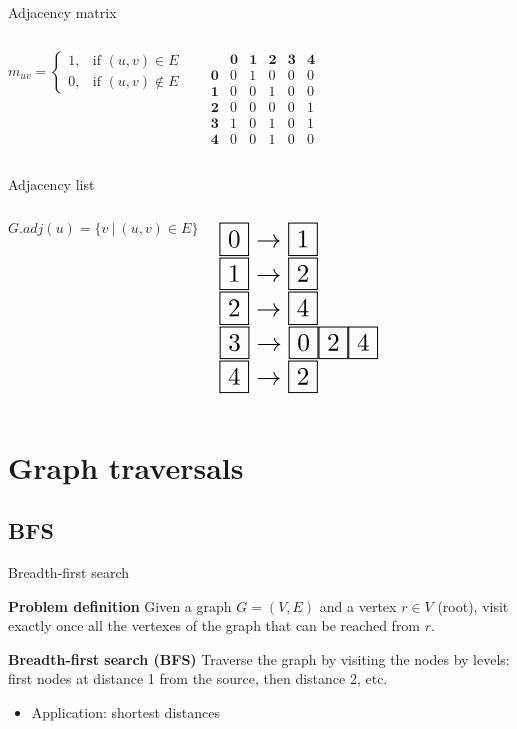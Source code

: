 \documentclass[compress]{beamer}
\newcommand\scalemath[2]{\scalebox{#1}{\mbox{\ensuremath{\displaystyle #2}}}}
\begin{document}
\begin{frame}{Adjacency matrix}
  \begin{columns}
    \[
    m_{uv} = \begin{cases}
      1, & \text{if $(u,v) \in E$} \\
      0, & \text{if $(u,v) \notin E$}
    \end{cases}
    \]
    
    \[
    \begin{matrix}
       & \textbf{0} & \textbf{1} & \textbf{2} & \textbf{3} & \textbf{4} \\
      \textbf{0} & 0 & 1 & 0 & 0 & 0 \\
      \textbf{1} & 0 & 0 & 1 & 0 & 0 \\
      \textbf{2} & 0 & 0 & 0 & 0 & 1 \\
      \textbf{3} & 1 & 0 & 1 & 0 & 1 \\
      \textbf{4} & 0 & 0 & 1 & 0 & 0
    \end{matrix}
    \]
  \end{columns}
\end{frame}

\begin{frame}{Adjacency list}
  \begin{columns}
  \[G.adj(u) = \{v \ | \ (u,v) \in E\}\]
  
  $\scalemath{1.8}{\fbox{0} \rightarrow \fbox{1}}$ \\
  $\scalemath{1.8}{\fbox{1} \rightarrow \fbox{2}}$ \\
  $\scalemath{1.8}{\fbox{2} \rightarrow \fbox{4}}$ \\
  $\scalemath{1.8}{\fbox{3} \rightarrow \fbox{0}\fbox{2}\fbox{4}}$ \\
  $\scalemath{1.8}{\fbox{4} \rightarrow \fbox{2}}$
  \end{columns}
\end{frame}

\section{Graph traversals}

\subsection{BFS}
\begin{frame}{Breadth-first search}
  \begin{block}{\textbf{Problem definition}}
    Given a graph $G = (V, E)$ and a vertex $r \in V$ (root), visit exactly once all the vertexes of the graph that can be reached from $r$.
  \end{block}
  \begin{block}{\textbf{Breadth-first search (BFS)}}
    Traverse the graph by visiting the nodes by levels: first nodes at distance 1 from the source, then distance 2, etc.
    \begin{itemize}
    \item Application: shortest distances
    \end{itemize}
  \end{block}
\end{frame}
\end{document}
